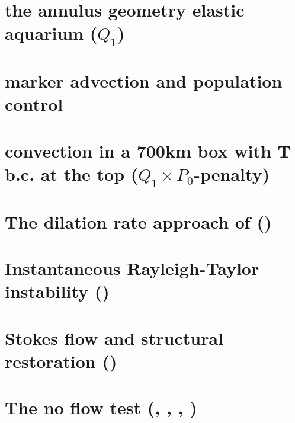\documentclass[a4paper,11pt]{report}
\begin{document}
\chapter{the annulus geometry elastic aquarium ($Q_1$)\label{f36}}%

\chapter{marker advection and population control \label{f37}} %

\chapter{convection in a 700km box with T b.c. at the top  ($Q_1\times P_0$-penalty) \label{f38}} %

\chapter{The dilation rate approach of \textcite{chpe15} (\QtwoQone) \label{f39}} %

\chapter{Instantaneous Rayleigh-Taylor instability (\QtwoQone) \label{f40}} %

\chapter{Stokes flow and structural restoration (\QtwoQone) \label{f41}} %

\chapter{The no flow test (\QonePzero, \QtwoQone, \QthreeQtwo, \QfourQthree)\label{f42}} %
\end{document}
